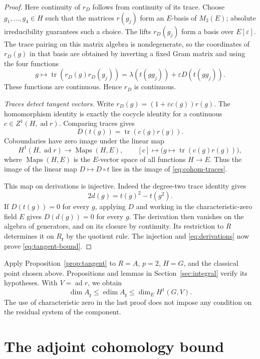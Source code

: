 \documentclass[11pt]{article}
\theoremstyle{remark}
\numberwithin{equation}{section}
\newcommand{\frakx}{\mathfrak x}
\newcommand{\eps}{\varepsilon}
\DeclareMathOperator{\tr}{tr}
\DeclareMathOperator{\ad}{ad}
\DeclareMathOperator{\edim}{edim}
\DeclareMathOperator{\Maps}{Maps}
\begin{document}
\begin{proof}
Here continuity of $r_D$ follows from continuity of its trace.
Choose $g_1,\ldots,g_4\in H$ such that the matrices $r(g_j)$
form an $E$-basis of $M_2(E)$; absolute irreducibility guarantees
such a choice. The lifts $r_D(g_j)$ form a basis over $E[\eps]$.
The trace pairing on this matrix algebra is nondegenerate, so
the coordinates of $r_D(g)$ in that basis are obtained by
inverting a fixed Gram matrix and using the four functions
\[
 g\longmapsto\tr(r_D(g)r_D(g_j))
       =\lambda(t(gg_j))+\eps D(t(gg_j)).
\]
These functions are continuous. Hence $r_D$ is continuous.

\smallskip\noindent
\emph{Traces detect tangent vectors.}
Write $r_D(g)=(1+\eps c(g))r(g)$. The homomorphism identity
is exactly the cocycle identity for a continuous
$c\in Z^1(H,\ad r)$. Comparing traces gives
\[
 D(t(g))=\tr(c(g)r(g)).
\]
Coboundaries have zero image under the linear map
\begin{equation}\label{eq:cohom-traces}
 H^1(H,\ad r)\longrightarrow\Maps(H,E),\qquad
 [c]\longmapsto\bigl(g\mapsto\tr(c(g)r(g))\bigr),
\end{equation}
where $\Maps(H,E)$ is the $E$-vector space of all functions $H\to E$.
Thus the image of the linear map $D\mapsto D\circ t$ lies in
the image of \eqref{eq:cohom-traces}.

This map on derivations is injective. Indeed the degree-two
trace identity gives
\[
 2d(g)=t(g)^2-t(g^2).
\]
If $D(t(g))=0$ for every $g$, applying $D$ and working in the
characteristic-zero field $E$ gives $D(d(g))=0$ for every $g$.
The derivation then vanishes on the algebra of generators, and
on its closure by continuity. Its restriction to $R$ determines
it on $R_{\frakx}$ by the quotient rule. The injection and
\eqref{eq:derivations} now prove \eqref{eq:tangent-bound}.
\end{proof}

Apply Proposition~\ref{prop:tangent} to $R=A$, $p=2$, $H=G$,
and the classical point chosen above. Propositions and lemmas in
Section~\ref{sec:integral} verify its hypotheses. With $V=\ad r$,
we obtain
\begin{equation}\label{eq:hecke-tangent}
 \dim A_{\frakx}\leq\edim A_{\frakx}
 \leq \dim_E H^1(G,V).
\end{equation}
The use of characteristic zero in the last proof does not impose
any condition on the residual system of the component.

\section{The adjoint cohomology bound}
\label{sec:selmer}
\end{document}
